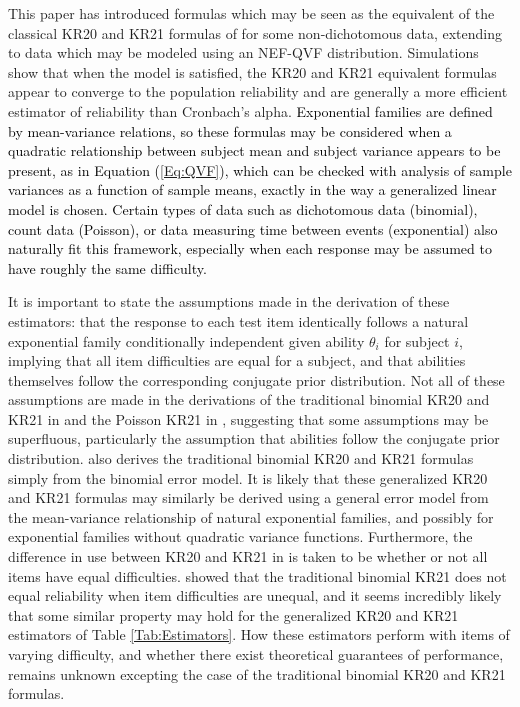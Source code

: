 \documentclass[12pt,epsfig]{article}
\newcommand{\changed}[1]{\textcolor{black}{#1}}
\begin{document}
This paper has introduced formulas which may be seen as the equivalent of the classical KR20 and KR21 formulas of \cite{Kuder1937} for some non-dichotomous data, extending to data which may be modeled using an NEF-QVF distribution. Simulations show that when the model is satisfied, the KR20 and KR21 equivalent formulas appear to converge to the population reliability and are generally a more efficient estimator of reliability than Cronbach's alpha. \changed{Exponential families are defined by mean-variance relations, so these formulas may be considered when a quadratic relationship between subject mean and subject variance appears to be present, as in Equation (\ref{Eq:QVF}), which can be checked with analysis of sample variances as a function of sample means, exactly in the way a generalized linear model is chosen. Certain types of data such as dichotomous data (binomial), count data (Poisson), or data measuring time between events (exponential) also naturally fit this framework, especially when each response may be assumed to have roughly the same difficulty.}

It is important to state the assumptions made in the derivation of these estimators: that the response to each test item identically follows a natural exponential family conditionally independent given ability $\theta_i$ for subject $i$, implying that all item difficulties are equal for a subject, and that abilities themselves follow the corresponding conjugate prior distribution. Not all of these assumptions are made in the derivations of the traditional binomial KR20 and KR21 in \cite{Kuder1937} and the Poisson KR21 in \cite{Allison1978}, suggesting that some assumptions may be superfluous, particularly the assumption that abilities follow the conjugate prior distribution. \cite{Feldt1984} also derives the traditional binomial KR20 and KR21 formulas simply from the binomial error model. It is likely that these generalized KR20 and KR21 formulas may similarly be derived using a general error model from the mean-variance relationship of natural exponential families, and possibly for exponential families without quadratic variance functions. Furthermore, the difference in use between KR20 and KR21 in \cite{Kuder1937} is taken to be whether or not all items have equal difficulties.  \cite{Zimmerman1972} showed that the traditional binomial KR21 does not equal reliability when item difficulties are unequal, and it seems incredibly likely that some similar property may hold for the generalized KR20 and KR21 estimators of Table \ref{Tab:Estimators}. How these estimators perform with items of varying difficulty, and whether there exist theoretical guarantees of performance, remains unknown excepting the case of the traditional binomial KR20 and KR21 formulas.
\end{document}
